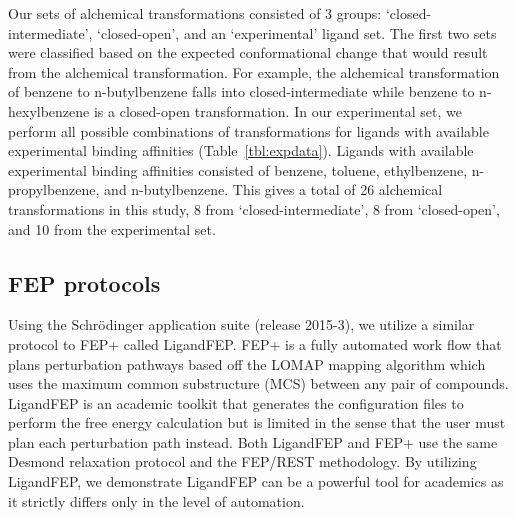 \documentclass[journal=jctcce,manuscript=article]{achemso}
\begin{document}
Our sets of alchemical transformations consisted of 3 groups: `closed-intermediate', `closed-open', and an `experimental' ligand set.
The first two sets were classified based on the expected conformational change that would result from the alchemical transformation.
For example, the alchemical transformation of benzene to n-butylbenzene falls into closed-intermediate while benzene to n-hexylbenzene is a closed-open transformation.
In our experimental set, we perform all possible combinations of transformations for ligands with available experimental binding affinities (Table~\ref{tbl:expdata}).
Ligands with available experimental binding affinities consisted of benzene, toluene, ethylbenzene, n-propylbenzene, and n-butylbenzene.
This gives a total of 26 alchemical transformations in this study, 8 from `closed-intermediate', 8 from `closed-open', and 10 from the experimental set.
 
\subsection*{FEP protocols}
Using the Schr\"{o}dinger application suite (release 2015-3)\cite{Maestro-Desmond}, we utilize a similar protocol to FEP+\cite{FEPplus} called LigandFEP\cite{LigandFEP}.
FEP+ is a fully automated work flow that plans perturbation pathways based off the LOMAP\cite{LOMAP} mapping algorithm which uses the maximum common substructure (MCS) between any pair of compounds.
LigandFEP is an academic toolkit that generates the configuration files to perform the free energy calculation but is limited in the sense that the user must plan each perturbation path instead.
Both LigandFEP and FEP+ use the same Desmond relaxation protocol and the FEP/REST methodology\cite{REST,REST2,FEP/REST,FEP/RESTapp}. 
By utilizing LigandFEP, we demonstrate LigandFEP can be a powerful tool for academics as it strictly differs only in the level of automation.
\end{document}
